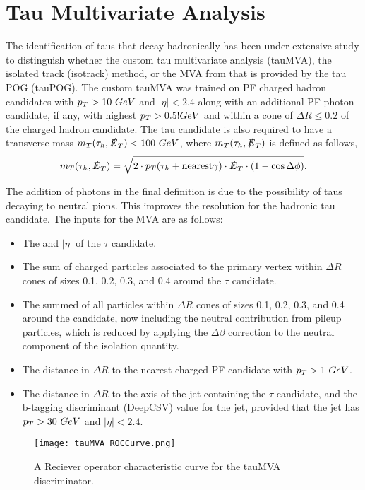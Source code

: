 \chapter{Tau Multivariate Analysis}\label{sec:TauMVA}

The identification of taus that decay hadronically has been under extensive study to distinguish whether the custom tau multivariate analysis (tauMVA), the isolated track (isotrack) method, or the MVA from that is provided by the tau POG (tauPOG). The custom tauMVA was trained on PF charged hadron candidates with $p_{T}>10~GeV$ and $|\eta|<2.4$ along with an additional PF photon candidate, if any, with highest $p_{T}>0.5!GeV$ and within a cone of $\Delta R\leq0.2$ of the charged hadron candidate. The tau candidate is also required to have a transverse mass $m_T(\tau_h,\slashed{E}_{T})<100~GeV$, where $m_T(\tau_h,\slashed{E}_{T})$ is defined as follows,
\begin{equation}\label{tauMT}
m_T(\tau_h,\slashed{E}_{T})=\sqrt{2\cdot p_{T}(\tau_h+\text{nearest}\gamma)\cdot\slashed{E}_{T}\cdot(1-\cos\Delta\phi)}.
\end{equation}

The addition of photons in the final definition is due to the possibility of taus decaying to neutral pions. This improves the resolution for the hadronic tau candidate. The inputs for the MVA are as follows:
\begin{itemize}
	\item The \pt and $|\eta|$ of the $\tau$ candidate.
	\item The sum \pt of charged particles associated to the primary vertex within $\Delta R$ cones of sizes 0.1, 0.2, 0.3, and 0.4 around the $\tau$ candidate.
	\item The summed \pt of all particles within $\Delta R$ cones of sizes 0.1, 0.2, 0.3, and 0.4 around the candidate, now including the neutral contribution from pileup particles, which is reduced by applying the $\Delta \beta$ correction to the neutral component of the isolation quantity. 
	\item The distance in $\Delta R$ to the nearest charged PF candidate with $p_{T}>1~GeV$.
	\item The distance in $\Delta R$ to the axis of the jet containing the $\tau$ candidate, and the b-tagging discriminant (DeepCSV) value for the jet, provided that the jet has $p_{T}>30~GeV$ and $|\eta|<2.4$.
\end{itemize}

\begin{figure}
 	\centering
	\texttt{[image: tauMVA\_ROCCurve.png]}
 	\caption[Tau MVA ROC Curve]{A Reciever operator characteristic curve for the tauMVA discriminator.}
 	\label{tauMVAROCCurve} 
\end{figure}

